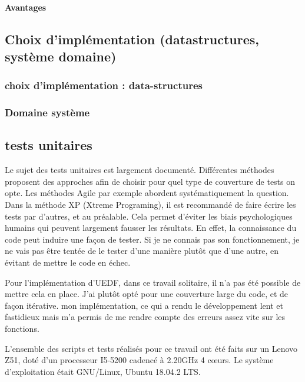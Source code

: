 	 \paragraph{Avantages} 
	
	\subsection{Choix d'implémentation (datastructures, système domaine)}
		\subsubsection{choix d'implémentation : data-structures}
		\subsubsection{Domaine système}
		
	\subsection{tests unitaires}
	Le sujet des tests unitaires est largement documenté.  Différentes méthodes 
	proposent des approches afin de choisir pour quel type de couverture de tests on opte.
	Les méthodes Agile par exemple abordent systématiquement la question. Dans la méthode XP (Xtreme Programing),
	il est recommandé de faire écrire les tests par d'autres, et au préalable. Cela permet d'éviter les biais 
	psychologiques humains qui peuvent largement fausser les résultats. En effet, 
	la connaissance du code peut induire une façon de tester. Si je ne connais pas son fonctionnement, 
	je ne vais pas être tentée de le tester d'une manière plutôt que d'une autre, en évitant de mettre 
	le code en échec.
	
	
	Pour l'implémentation d'UEDF, dans ce travail solitaire, il n'a pas été possible de mettre cela en place.
	J'ai plutôt opté pour une couverture large du code, et de façon itérative. 	
	mon implémentation, ce qui a rendu le développement lent et fastidieux mais m'a permis de me rendre compte des 
	erreurs assez vite sur les fonctions.
	
	
	L'ensemble des scripts et tests réalisés pour ce travail ont été faits sur un 
	Lenovo Z51, doté d'un processeur I5-5200 cadencé à 2.20GHz 4 cœurs. 
	Le système d'exploitation était GNU/Linux, Ubuntu 18.04.2 LTS. 
	
